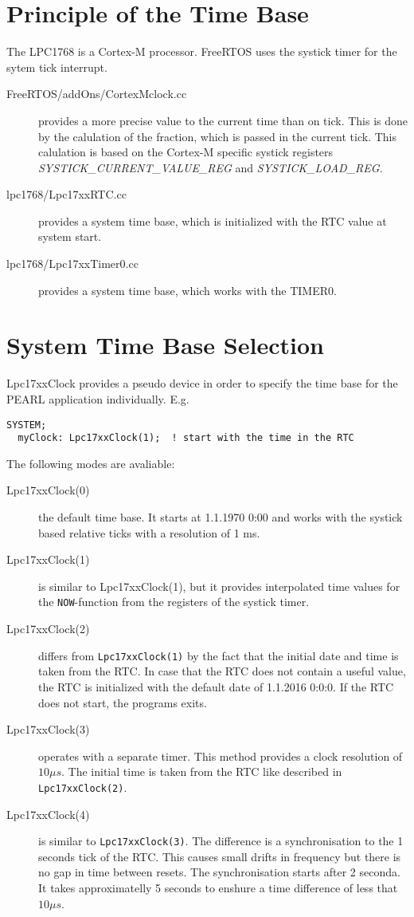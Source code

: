 \section{Principle of the Time Base}
The LPC1768 is a Cortex-M processor. FreeRTOS uses the systick timer 
for the sytem tick interrupt. 
\begin{description}
\item[FreeRTOS/addOns/CortexMclock.cc] provides a more precise value to
 the current time than on tick.
This is done
by the calulation of the fraction, which is passed in the current tick.
This calulation is based on the Cortex-M specific systick registers
{\em SYSTICK\_CURRENT\_VALUE\_REG} and {\em SYSTICK\_LOAD\_REG}.
\item[lpc1768/Lpc17xxRTC.cc] provides a system time base, which is 
initialized with the RTC value at system start.
\item[lpc1768/Lpc17xxTimer0.cc] provides a system time base, which works 
with the TIMER0.
\end{description}

\section{System Time Base Selection}
Lpc17xxClock provides a pseudo device in order
   to specify the time base for the PEARL application individually. E.g.

\begin{verbatim}
SYSTEM;
  myClock: Lpc17xxClock(1);  ! start with the time in the RTC
\end{verbatim}

The following modes are avaliable:
\begin{description}
\item[Lpc17xxClock(0)] the default time base. It starts at 1.1.1970 0:00
   and works with the systick based relative ticks with a resolution of 1 ms.
\item[Lpc17xxClock(1)] is similar to Lpc17xxClock(1), but it provides
   interpolated time values  for the \texttt{NOW}-function 
   from the registers of the systick timer.
\item[Lpc17xxClock(2)] differs from \texttt{Lpc17xxClock(1)} by the fact 
    that the initial date and time is taken from the RTC.
    In case that the RTC does not contain a useful value, the RTC
    is initialized with the default date of 1.1.2016 0:0:0.
    If the RTC does not start, the programs exits.
\item[Lpc17xxClock(3)] operates with a separate timer. This method
    provides a clock resolution of $10 \mu s$. The initial time is taken
    from the RTC like described in \texttt{Lpc17xxClock(2)}.
\item[Lpc17xxClock(4)] is similar to \texttt{Lpc17xxClock(3)}. 
    The difference is a synchronisation to the 1 seconds tick of the RTC.
    This causes small drifts in frequency but there is no gap in time 
    between resets. The synchronisation starts after 2 seconda.
    It takes approximatelly  5 seconds to enshure a time difference of
     less that $10\mu s$.
\end{description}

